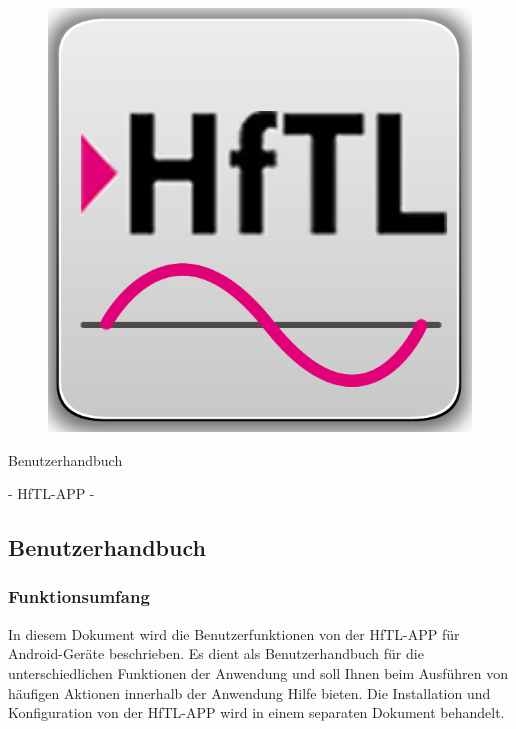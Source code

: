 \begin{figure}[h]
	\centering
	\includegraphics[scale=2.5]{03_Bedienungsanleitung/img/Logo_HFTl_App.png}
	\label{img:grafik-dummy}
\end{figure}

\begin{center}
	{\huge Benutzerhandbuch}
\end{center}

\begin{center}
	{\huge -  HfTL-APP  -}
\end{center}



\newpage
\subsection{Benutzerhandbuch}
\subsubsection{Funktionsumfang}
In diesem Dokument wird die Benutzerfunktionen von der HfTL-APP für
Android-Geräte beschrieben. Es dient als Benutzerhandbuch für die
unterschiedlichen Funktionen der Anwendung und soll Ihnen beim
Ausführen von häufigen Aktionen innerhalb der Anwendung Hilfe bieten.
Die Installation und Konfiguration von der HfTL-APP wird in einem
separaten Dokument behandelt.

